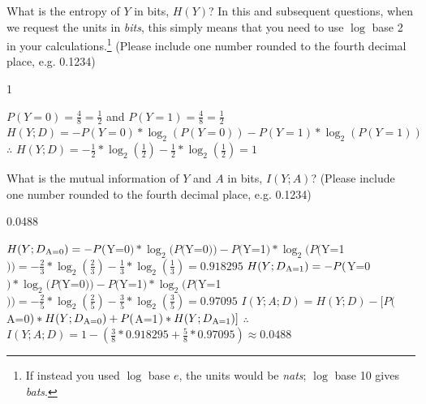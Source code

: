 \documentclass[11pt,addpoints,answers]{exam}
\begin{document}
\begin{questions}
    \question[1] What is the entropy of $Y$ in bits, $H(Y)$? In this and subsequent questions, when we request the units in \emph{bits}, this simply means that you need to use $\log$ base 2 in your calculations.\footnote{If instead you used $\log$ base $e$, the units would be \emph{nats}; $\log$ base 10 gives \emph{bats}.}
    (Please include one number rounded to the fourth decimal place, e.g. 0.1234)
    
    \begin{your_solution}[title=$H(Y)$,height=2cm,width=3cm]
    1
    \end{your_solution}
    \begin{your_solution}[title=Work,height=3cm,width=12cm]
	$P(Y=0) = \frac{4}{8} = \frac{1}{2}$ and $P(Y=1) = \frac{4}{8} = \frac{1}{2}$ \newline   \newline
    $H(Y; D) = - P(Y=0) * \log_{2}(P(Y=0)) - P(Y=1) * \log_{2}(P(Y=1))$
    $\therefore$ $H(Y; D) = - \frac{1}{2} * \log_{2}(\frac{1}{2}) - \frac{1}{2} * \log_{2}(\frac{1}{2}) = 1$    
    
    
    
    
    \end{your_solution}

    \clearpage
    
        \question[1] What is the mutual information
    of $Y$ and $A$ in bits, $I(Y; A)$?
    (Please include one number rounded to the fourth decimal place, e.g. 0.1234)
    
    \begin{your_solution}[title=$I(Y;A)$,height=2cm,width=3cm]
    0.0488
    \end{your_solution}
    \begin{your_solution}[title=Work,height=5cm,width=12cm]
    
    $H(Y;D\textsubscript{A=0}) = - P($Y=0$) * \log_{2}(P($Y=0$)) - P($Y=1$) * \log_{2}(P($Y=1$)) = - \frac{2}{3}*\log_2(\frac{2}{3}) - \frac{1}{3}*\log_2(\frac{1}{3}) = 0.918295$\newline
    $H(Y;D\textsubscript{A=1}) = - P($Y=0$) * \log_{2}(P($Y=0$)) - P($Y=1$) * \log_{2}(P($Y=1$)) = - \frac{2}{5}*\log_2(\frac{2}{5}) - \frac{3}{5}*\log_2(\frac{3}{5}) = 0.97095$\newline\newline
    $I(Y;A;D) = H(Y;D) - [P($A=0$)*H(Y;D\textsubscript{A=0}) + P($A=1$)*H(Y;D\textsubscript{A=1})]$\newline
    $\therefore$ $I(Y;A;D) = 1 - (\frac{3}{8} * 0.918295 + \frac{5}{8} * 0.97095) \approx 0.0488$
    

\end{your_solution}
\end{questions}
\end{document}
